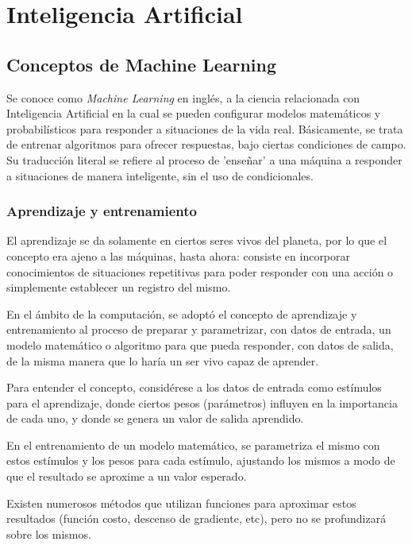 \documentclass[a4paper,12pt,oneside,spanish]{book}
\begin{document}
\newpage	
\chapter{Inteligencia Artificial}
\section{Conceptos de Machine Learning}\label{machinelearning}

Se conoce como \textit{Machine Learning} en inglés, a la ciencia relacionada con Inteligencia Artificial en la cual se pueden configurar modelos matemáticos y probabilísticos para responder a situaciones de la vida real. Básicamente, se trata de entrenar algoritmos para ofrecer respuestas, bajo ciertas condiciones de campo. Su traducción literal se refiere al proceso de 'enseñar' a una máquina a responder a situaciones de manera inteligente, sin el uso de condicionales.\par
	
\subsection{Aprendizaje y entrenamiento}
El aprendizaje se da solamente en ciertos seres vivos del planeta, por lo que el concepto era ajeno a las máquinas, hasta ahora: consiste en incorporar conocimientos de situaciones repetitivas para poder responder con una acción o simplemente establecer un registro del mismo.\par

En el ámbito de la computación, se adoptó el concepto de aprendizaje y entrenamiento al proceso de preparar y parametrizar, con datos de entrada, un modelo matemático o algoritmo para que pueda responder, con datos de salida, de la misma manera que lo haría un ser vivo capaz de aprender.\par

Para entender el concepto, considérese a los datos de entrada como estímulos para el aprendizaje, donde ciertos pesos (parámetros) influyen en la importancia de cada uno, y donde se genera un valor de salida aprendido.\par

En el entrenamiento de un modelo matemático, se parametriza el mismo con estos estímulos y los pesos para cada estímulo, ajustando los mismos a modo de que el resultado se aproxime a un valor esperado.  \par

Existen numerosos métodos que utilizan funciones para aproximar estos resultados (función costo, descenso de gradiente, etc), pero no se profundizará sobre los mismos. \par
\end{document}
